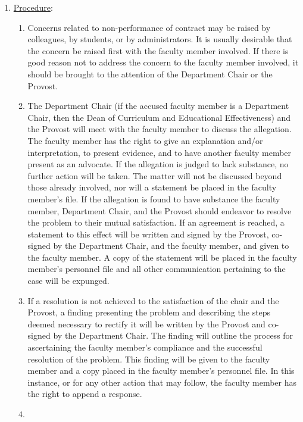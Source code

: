 \begin{enumerate}[label=\alph*)]
					\item{\underline{Procedure}:
						\label{par:NonPerformanceOfContract-Procedure}
						\begin{enumerate}[label=\arabic*)]
							\item{
								\label{par:NonPerformanceOfContract-Procedure-Concerns}
								Concerns related to non-performance of contract may be raised by colleagues, by students, or by administrators.  It is usually desirable that the concern be raised first with the faculty member involved.  If there is good reason not to address the concern to the faculty member involved, it should be brought to the attention of the Department Chair or the Provost.}
							\item{The Department Chair (if the accused faculty member is a Department Chair, then the Dean of Curriculum and Educational Effectiveness) and the Provost will meet with the faculty member to discuss the allegation.  The faculty member has the right to give an explanation and/or interpretation, to present evidence, and to have another faculty member present as an advocate.  If the allegation is judged to lack substance, no further action will be taken.  The matter will not be discussed beyond those already involved, nor will a statement be placed in the faculty member's file.  If the allegation is found to have substance the faculty member, Department Chair, and the Provost should endeavor to resolve the problem to their mutual satisfaction.  If an agreement is reached, a statement to this effect will be written and signed by the Provost, co-signed by the Department Chair, and the faculty member, and given to the faculty member.  A copy of the statement will be placed in the faculty member's personnel file and all other communication pertaining to the case will be expunged.}
							\item{
								\label{par:NonPerformanceOfContract-Procedure-Compliance}
								If a resolution is not achieved to the satisfaction of the chair and the Provost, a finding presenting the problem and describing the steps deemed necessary to rectify it will be written by the Provost and co-signed by the Department Chair. The finding will outline the process for ascertaining the faculty member's compliance and the successful resolution of the problem.  This finding will be given to the faculty member and a copy placed in the faculty member's personnel file. In this instance, or for any other action that may follow, the faculty member has the right to append a response.}
							\item{
}
\end{enumerate}}
\end{enumerate}
